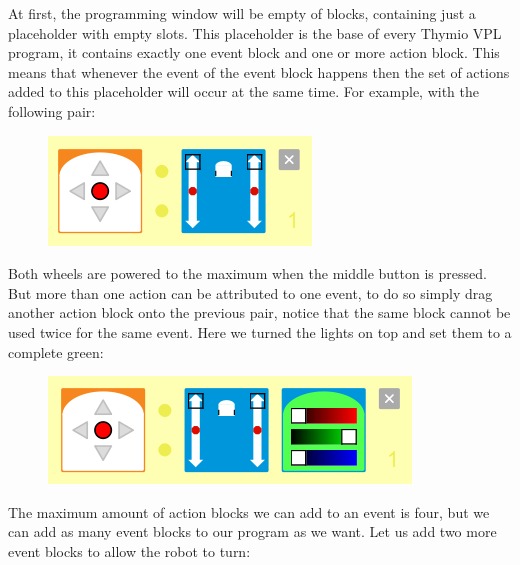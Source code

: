 \documentclass{scrartcl}
\begin{document}
At first, the programming window will be empty of blocks, containing just a placeholder with empty slots. 
This placeholder is the base of every Thymio VPL program, it contains exactly one event block and one or more action block. 
This means that whenever the event of the event block happens then the set of actions added to this placeholder will occur at the same time. 
For example, with the following pair:
\begin{figure}[h!]
  \includegraphics[width=\textwidth]{./VPL/middlebtn_forward}
  \label{fig:thymio_vpl_middlebtn_1e1a}
\end{figure}
Both wheels are powered to the maximum when the middle button is pressed. But more than one action can be attributed to one event, 
to do so simply drag another action block onto the previous pair, notice that the same block cannot be used twice for the same event. 
Here we turned the lights on top and set them to a complete green:
\begin{figure}[h!]
  \includegraphics[width=\textwidth]{./VPL/middlebtn_forward_green}
  \label{fig:thymio_vpl_middlebtn_1e2a}
\end{figure}
The maximum amount of action blocks we can add to an event is four, but we can add as many event blocks to our program as we want. 
Let us add two more event blocks to allow the robot to turn:
\end{document}
